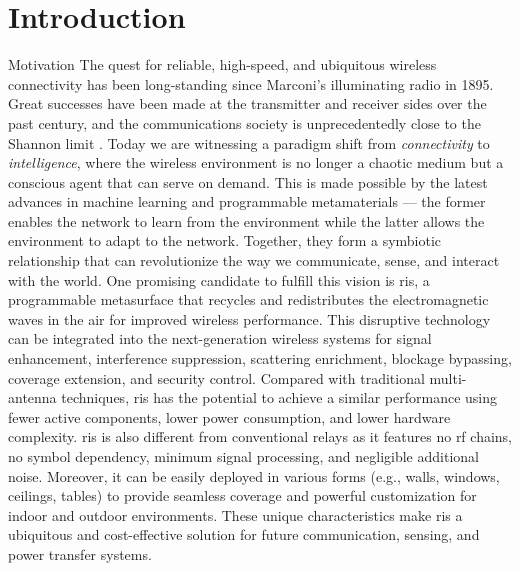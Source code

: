
\graphicspath{{assets/chapter_1/}}

\chapter{Introduction}\label{ch:introduction}

\begin{section}{Motivation}
	The quest for reliable, high-speed, and ubiquitous wireless connectivity has been long-standing since Marconi's illuminating radio in 1895.
	Great successes have been made at the transmitter and receiver sides over the past century, and the communications society is unprecedentedly close to the Shannon limit \cite{Shannon1948}.
	Today we are witnessing a paradigm shift from \emph{connectivity} to \emph{intelligence}, where the wireless environment is no longer a chaotic medium but a conscious agent that can serve on demand.
	This is made possible by the latest advances in machine learning and programmable metamaterials --- the former enables the network to learn from the environment while the latter allows the environment to adapt to the network.
	Together, they form a symbiotic relationship that can revolutionize the way we communicate, sense, and interact with the world.
	One promising candidate to fulfill this vision is \gls{ris}, a programmable metasurface that recycles and redistributes the electromagnetic waves in the air for improved wireless performance.
	This disruptive technology can be integrated into the next-generation wireless systems for signal enhancement, interference suppression, scattering enrichment, blockage bypassing, coverage extension, and security control.
	Compared with traditional multi-antenna techniques, \gls{ris} has the potential to achieve a similar performance using fewer active components, lower power consumption, and lower hardware complexity.
	\gls{ris} is also different from conventional relays as it features no \gls{rf} chains, no symbol dependency, minimum signal processing, and negligible additional noise.
	Moreover, it can be easily deployed in various forms (e.g., walls, windows, ceilings, tables) to provide seamless coverage and powerful customization for indoor and outdoor environments.
	These unique characteristics make \gls{ris} a ubiquitous and cost-effective solution for future communication, sensing, and power transfer systems.


\end{section}
